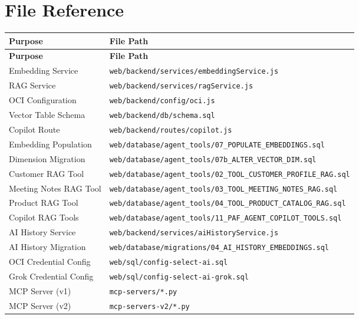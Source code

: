 \documentclass[12pt,a4paper]{article}
\begin{document}
\appendix

\section{File Reference}
\label{app:files}

\begin{longtable}{p{4.5cm} p{9cm}}
\toprule
\textbf{Purpose} & \textbf{File Path} \\
\midrule
\endfirsthead
\toprule
\textbf{Purpose} & \textbf{File Path} \\
\midrule
\endhead
Embedding Service & \texttt{web/backend/services/embeddingService.js} \\
RAG Service & \texttt{web/backend/services/ragService.js} \\
OCI Configuration & \texttt{web/backend/config/oci.js} \\
Vector Table Schema & \texttt{web/backend/db/schema.sql} \\
Copilot Route & \texttt{web/backend/routes/copilot.js} \\
Embedding Population & \texttt{web/database/agent\_tools/07\_POPULATE\_EMBEDDINGS.sql} \\
Dimension Migration & \texttt{web/database/agent\_tools/07b\_ALTER\_VECTOR\_DIM.sql} \\
Customer RAG Tool & \texttt{web/database/agent\_tools/02\_TOOL\_CUSTOMER\_PROFILE\_RAG.sql} \\
Meeting Notes RAG Tool & \texttt{web/database/agent\_tools/03\_TOOL\_MEETING\_NOTES\_RAG.sql} \\
Product RAG Tool & \texttt{web/database/agent\_tools/04\_TOOL\_PRODUCT\_CATALOG\_RAG.sql} \\
Copilot RAG Tools & \texttt{web/database/agent\_tools/11\_PAF\_AGENT\_COPILOT\_TOOLS.sql} \\
AI History Service & \texttt{web/backend/services/aiHistoryService.js} \\
AI History Migration & \texttt{web/database/migrations/04\_AI\_HISTORY\_EMBEDDINGS.sql} \\
OCI Credential Config & \texttt{web/sql/config-select-ai.sql} \\
Grok Credential Config & \texttt{web/sql/config-select-ai-grok.sql} \\
MCP Server (v1) & \texttt{mcp-servers/*.py} \\
MCP Server (v2) & \texttt{mcp-servers-v2/*.py} \\
\bottomrule
\end{longtable}
\end{document}
